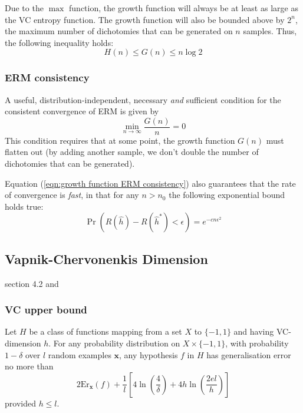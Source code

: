 Due to the $\max$ function, the growth function will always be at
least as large as the VC entropy function.  The growth function will
also be bounded above by $2^n$, the maximum number of dichotomies that
can be generated on $n$ samples.  Thus, the following inequality holds:
%
\begin{equation}
H(n) \leq G(n) \leq n \log 2
\end{equation}

\subsubsection{ERM consistency}

A useful, distribution-independent, necessary \emph{and} sufficient
condition for the consistent convergence of ERM is
given by
%
\begin{equation}
\min_{n \rightarrow \infty} \frac{G(n)}{n} = 0
\label{eqn:growth function ERM consistency}
\end{equation}
%
This condition requires that at some point, the growth function $G(n)$
must flatten out (by adding another sample, we don't double the number
of dichotomies that can be generated).

Equation (\ref{eqn:growth function ERM consistency}) also guarantees
that the rate of convergence is \emph{fast}, in that for any $n >
n_0$ the following exponential bound holds true: 
\begin{equation}
\Pr \left( R(\hat{h}) - R(\hat{h}^{\ast}) < \epsilon \right) =
e^{-cn\epsilon^2}
\end{equation}
 


\subsection{Vapnik-Chervonenkis Dimension}
\cite{Cherkassky98} section 4.2 and \cite{Bartlett98a}

\subsubsection{VC upper bound}

Let $H$ be a class of functions mapping from a set $X$ to $\{-1, 1\}$
and having VC-dimension $h$.  For any probability distribution on $X
\times \{-1,1\}$, with probability $1-\delta$ over $l$ random examples
$\mathbf{x}$, any hypothesis $f$ in $H$ has generalisation error no
more than
\begin{equation}
2\mathrm{Er}_{\mathbf{x}}(f) + \frac{1}{l} \left[ 4 \ln 
\left( \frac{4}{\delta} \right) + 4 h \ln \left( \frac{2 e l}{h}
\right) \right]
\end{equation}
provided $h \leq l$.

